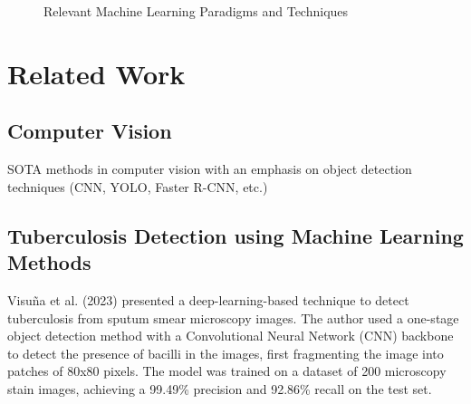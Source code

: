 \documentclass[../main.tex]{subfiles}
\begin{document}

    \newpage

    \begin{figure}
        \centering
        \caption{Relevant Machine Learning Paradigms and Techniques}
        \resizebox*{1.1\columnwidth}{!}{
            \hspace*{-3cm}
            
        }
        \label{fig:relevant_ml_paradigms}
    \end{figure}
    \clearpage
    

    
	
    

    \section{Related Work} \label{related_work}

    \subsection{Computer Vision} \label{sec:computer_vision_sota}

    SOTA methods in computer vision with an emphasis on object detection techniques (CNN, YOLO, Faster R-CNN, etc.)

    \subsection{Tuberculosis Detection using Machine Learning Methods} \label{sec:ml_tuberculosis_detection}

    Visuña et al. (2023) \cite{visuna_novel_2023} presented a deep-learning-based technique to detect tuberculosis from sputum smear microscopy images. The author used a one-stage object detection method with a Convolutional Neural Network (CNN) backbone to detect the presence of bacilli in the images, first fragmenting the image into patches of 80x80 pixels. The model was trained on a dataset of 200 microscopy stain images, achieving a 99.49\% precision and 92.86\% recall on the test set. 
    
\end{document}
